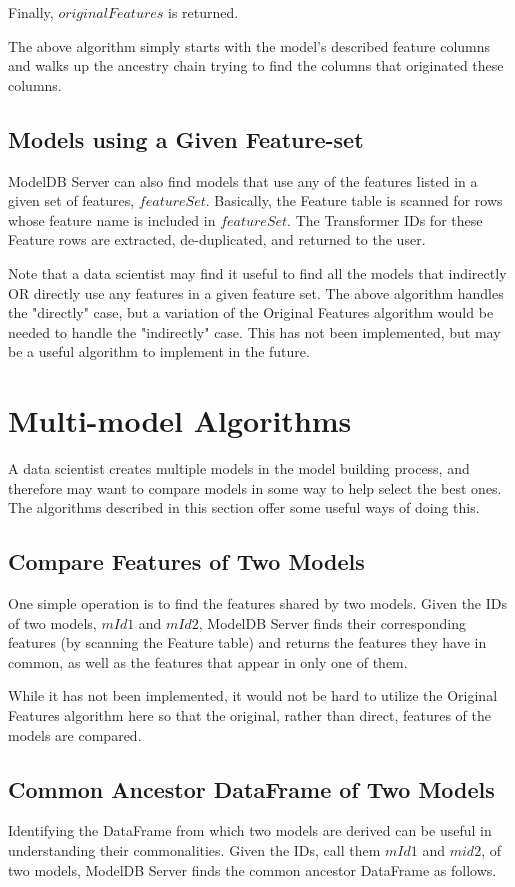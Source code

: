 Finally, $originalFeatures$ is returned.

The above algorithm simply starts with the model's described feature columns and walks up the ancestry chain trying to find
the columns that originated these columns.

\subsection{Models using a Given Feature-set}
ModelDB Server can also find models that use any of the features listed in a given set of features, $featureSet$. Basically,
the Feature table is scanned for rows whose feature name is included in $featureSet$. The Transformer IDs for these
Feature rows are extracted, de-duplicated, and returned to the user.

Note that a data scientist may find it useful to find all the models that indirectly OR directly use any features in a 
given feature set. The above algorithm handles the "directly" case, but a variation of the Original Features algorithm would
be needed to handle the "indirectly" case. This has not been implemented, but may be a useful algorithm to implement in the future.

\section{Multi-model Algorithms}
A data scientist creates multiple models in the model building process, and therefore may want
to compare models in some way to help select the best ones. The algorithms
described in this section offer some useful ways of doing this.

\subsection{Compare Features of Two Models}
One simple operation is to find the features shared by two models. Given the IDs
of two models, $mId1$ and $mId2$, ModelDB Server finds their corresponding features 
(by scanning the Feature table) and returns the features they have in common, 
as well as the features that appear in only one of them.

While it has not been implemented, it would not be hard to utilize the Original Features algorithm here
so that the original, rather than direct, features of the models are compared.

\subsection{Common Ancestor DataFrame of Two Models}
Identifying the DataFrame from which two models are derived can be useful in
understanding their commonalities. Given the IDs, call them $mId1$ and $mid2$, 
of two models, ModelDB Server finds the common ancestor DataFrame as follows.

